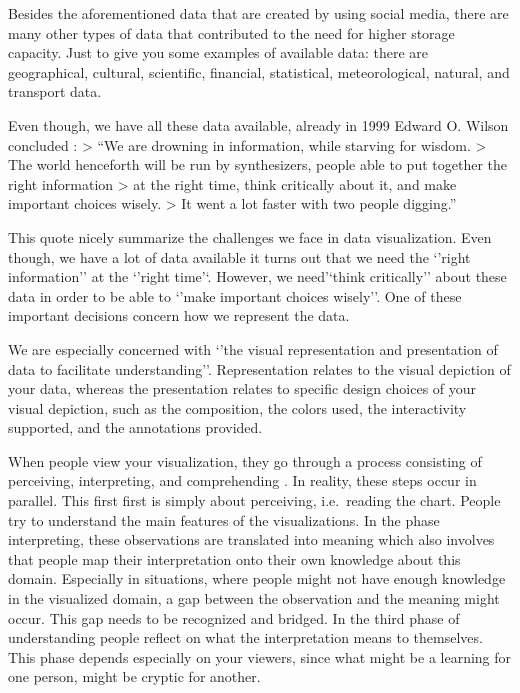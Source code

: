 \documentclass[
]{book}
\begin{document}
Besides the aforementioned data that are created by using social media, there are many other types of data that contributed to the need for higher storage capacity. Just to give you some examples of available data: there are geographical, cultural, scientific, financial, statistical, meteorological, natural, and transport data.

Even though, we have all these data available, already in 1999 Edward O. Wilson concluded \citep{wilson1999consilience}:
\textgreater{} ``We are drowning in information, while starving for wisdom.
\textgreater{} The world henceforth will be run by synthesizers, people able to put together the right information
\textgreater{} at the right time, think critically about it, and make important choices wisely.
\textgreater{} It went a lot faster with two people digging.''

This quote nicely summarize the challenges we face in data visualization. Even though, we have a lot of data available it turns out that we need the `'right information'' at the `'right time'`. However, we need'`think critically'' about these data in order to be able to `'make important choices wisely''. One of these important decisions concern how we represent the data.

We are especially concerned with `'the visual representation and presentation of data to facilitate understanding''\citep{kirk2019data}. Representation relates to the visual depiction of your data, whereas the presentation relates to specific design choices of your visual depiction, such as the composition, the colors used, the interactivity supported, and the annotations provided.

When people view your visualization, they go through a process consisting of perceiving, interpreting, and comprehending \citep{kirk2019data}. In reality, these steps occur in parallel. This first first is simply about perceiving, i.e.~reading the chart. People try to understand the main features of the visualizations. In the phase interpreting, these observations are translated into meaning which also involves that people map their interpretation onto their own knowledge about this domain. Especially in situations, where people might not have enough knowledge in the visualized domain, a gap between the observation and the meaning might occur. This gap needs to be recognized and bridged. In the third phase of understanding people reflect on what the interpretation means to themselves. This phase depends especially on your viewers, since what might be a learning for one person, might be cryptic for another.
\end{document}
